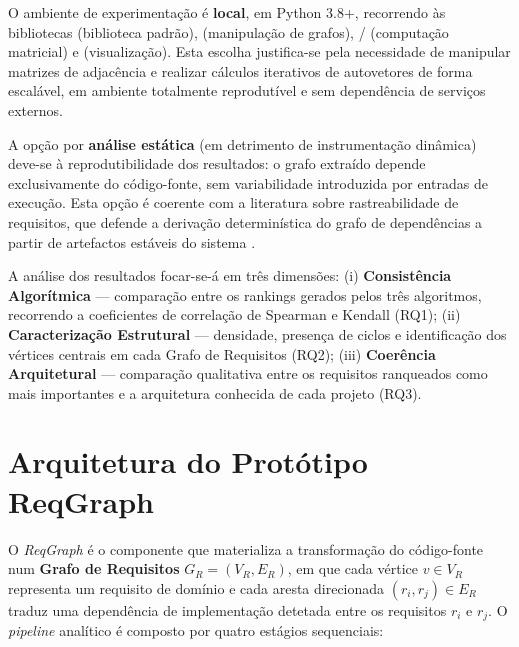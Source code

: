 O ambiente de experimentação é \textbf{local}, em Python 3.8+,
recorrendo às bibliotecas  (biblioteca padrão),
 (manipulação de grafos), /
(computação matricial) e  (visualização). Esta
escolha justifica-se pela necessidade de manipular matrizes de
adjacência e realizar cálculos iterativos de autovetores de forma
escalável, em ambiente totalmente reprodutível e sem dependência de
serviços externos.

A opção por \textbf{análise estática} (em detrimento de instrumentação
dinâmica) deve-se à reprodutibilidade dos resultados: o grafo
extraído depende exclusivamente do código-fonte, sem variabilidade
introduzida por entradas de execução. Esta opção é coerente com a
literatura sobre rastreabilidade de requisitos, que defende a
derivação determinística do grafo de dependências a partir de
artefactos estáveis do sistema
\parencite{silva2018, gotel1994, rasiman2022}.

A análise dos resultados focar-se-á em três dimensões:
(i) \textbf{Consistência Algorítmica} --- comparação entre os
rankings gerados pelos três algoritmos, recorrendo a coeficientes de
correlação de Spearman e Kendall (RQ1);
(ii) \textbf{Caracterização Estrutural} --- densidade, presença de
ciclos e identificação dos vértices centrais em cada Grafo de
Requisitos (RQ2);
(iii) \textbf{Coerência Arquitetural} --- comparação qualitativa
entre os requisitos ranqueados como mais importantes e a arquitetura
conhecida de cada projeto (RQ3).

\section{Arquitetura do Protótipo ReqGraph}
\label{sec:reqgraph}

O \emph{ReqGraph} é o componente que materializa a transformação do
código-fonte num \textbf{Grafo de Requisitos}
$G_R = (V_R, E_R)$, em que cada vértice $v \in V_R$ representa um
requisito de domínio e cada aresta direcionada
$(r_i, r_j) \in E_R$ traduz uma dependência de implementação
detetada entre os requisitos $r_i$ e $r_j$. O \emph{pipeline}
analítico é composto por quatro estágios sequenciais:

